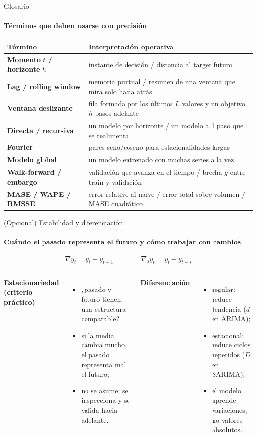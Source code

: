 \documentclass[aspectratio=169,11pt]{beamer}  %
\newcommand{\hrow}{\rowcolor{mlcream}}
\begin{document}
\begin{frame}{Glosario}
\framesubtitle{Términos que deben usarse con precisión}
\centering\scriptsize
\begin{tabular}{@{}l P{0.66\textwidth}@{}}
\toprule
\hrow \textbf{Término} & Interpretación operativa\\
\midrule
\textbf{Momento $t$ / horizonte $h$} & instante de decisión / distancia al target futuro\\
\textbf{Lag / rolling window} & memoria puntual / resumen de una ventana que mira solo hacia atrás\\
\textbf{Ventana deslizante} & fila formada por los últimos $L$ valores y un objetivo $h$ pasos adelante\\
\textbf{Directa / recursiva} & un modelo por horizonte / un modelo a 1 paso que se realimenta\\
\textbf{Fourier} & pares seno/coseno para estacionalidades largas\\
\textbf{Modelo global} & un modelo entrenado con muchas series a la vez\\
\textbf{Walk-forward / embargo} & validación que avanza en el tiempo / brecha $g$ entre train y validación\\
\textbf{MASE / WAPE / RMSSE} & error relativo al naïve / error total sobre volumen / MASE cuadrático\\
\bottomrule
\end{tabular}
\end{frame}

\begin{frame}{(Opcional) Estabilidad y diferenciación}
\framesubtitle{Cuándo el pasado representa el futuro y cómo trabajar con cambios}
{\large\[ \nabla y_t = y_t - y_{t-1} \qquad\qquad \nabla_s y_t = y_t - y_{t-s} \]}
\begin{columns}[T]
\textbf{Estacionariedad (criterio práctico)}
\begin{itemize}\small
\item ¿pasado y futuro tienen una estructura comparable?
\item si la media cambia mucho, el pasado representa mal el futuro;
\item no se asume: se inspecciona y se valida hacia adelante.
\end{itemize}
\textbf{Diferenciación}
\begin{itemize}\small
\item regular: reduce tendencia ($d$ en ARIMA);
\item estacional: reduce ciclos repetidos ($D$ en SARIMA);
\item el modelo aprende variaciones, no valores absolutos.
\end{itemize}
\end{columns}
\end{frame}
\end{document}
